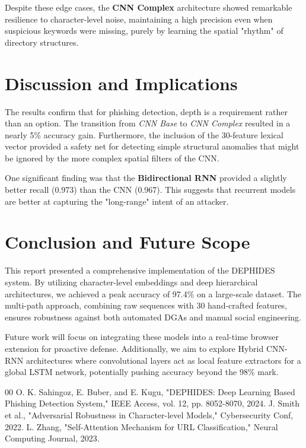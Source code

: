 \documentclass[journal,twocolumn]{IEEEtran}
\begin{document}
Despite these edge cases, the \textbf{CNN Complex} architecture showed remarkable resilience to character-level noise, maintaining a high precision even when suspicious keywords were missing, purely by learning the spatial "rhythm" of directory structures.

\section{Discussion and Implications}
The results confirm that for phishing detection, depth is a requirement rather than an option. The transition from \textit{CNN Base} to \textit{CNN Complex} resulted in a nearly 5\% accuracy gain. Furthermore, the inclusion of the 30-feature lexical vector provided a safety net for detecting simple structural anomalies that might be ignored by the more complex spatial filters of the CNN.

One significant finding was that the \textbf{Bidirectional RNN} provided a slightly better recall (0.973) than the CNN (0.967). This suggests that recurrent models are better at capturing the "long-range" intent of an attacker.

\section{Conclusion and Future Scope}
This report presented a comprehensive implementation of the DEPHIDES system. By utilizing character-level embeddings and deep hierarchical architectures, we achieved a peak accuracy of 97.4\% on a large-scale dataset. The multi-path approach, combining raw sequences with 30 hand-crafted features, ensures robustness against both automated DGAs and manual social engineering.

Future work will focus on integrating these models into a real-time browser extension for proactive defense. Additionally, we aim to explore Hybrid CNN-RNN architectures where convolutional layers act as local feature extractors for a global LSTM network, potentially pushing accuracy beyond the 98\% mark.

\begin{thebibliography}{00}
 O. K. Sahingoz, E. Buber, and E. Kugu, "DEPHIDES: Deep Learning Based Phishing Detection System," IEEE Access, vol. 12, pp. 8052-8070, 2024.
 J. Smith et al., "Adversarial Robustness in Character-level Models," Cybersecurity Conf, 2022.
 L. Zhang, "Self-Attention Mechanism for URL Classification," Neural Computing Journal, 2023.
\end{thebibliography}
\end{document}
